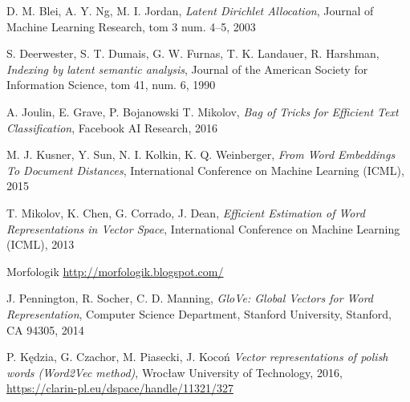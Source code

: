 \documentclass[twoside,twocolumn]{article}
\begin{document}
	
	\begin{thebibliography}{99}
		D. M. Blei, A. Y. Ng, M. I. Jordan,
		\emph{Latent Dirichlet Allocation},
		Journal of Machine Learning Research, tom 3 num. 4–5,
		2003
		
		S. Deerwester, S. T. Dumais, G. W. Furnas, T. K. Landauer, R. Harshman,
		\emph{Indexing by latent semantic analysis},
		Journal of the American Society for Information Science, tom 41, num. 6,
		1990
		
		A. Joulin, E. Grave, P. Bojanowski T. Mikolov,
		\emph{Bag of Tricks for Efficient Text Classification},
		Facebook AI Research,
		2016
		
		M. J. Kusner, Y. Sun, N. I. Kolkin, K. Q. Weinberger,
		\emph{From Word Embeddings To Document Distances},
		International Conference on Machine Learning (ICML),
		2015
		
		T. Mikolov, K. Chen, G. Corrado, J. Dean,
		\emph{Efficient Estimation of Word Representations in Vector Space},
		International Conference on Machine Learning (ICML),
		2013
		
		Morfologik
		\url{http://morfologik.blogspot.com/}
		
		J. Pennington, R. Socher, C. D. Manning,
		\emph{GloVe: Global Vectors for Word Representation},
		Computer Science Department, Stanford University, Stanford, CA 94305,
		2014

		P. Kędzia, G. Czachor, M. Piasecki, J. Kocoń
		\emph{Vector representations of polish words (Word2Vec method)},
		Wrocław University of Technology,
		2016,
		\url{https://clarin-pl.eu/dspace/handle/11321/327}
	\end{thebibliography}
	
	
\end{document}
